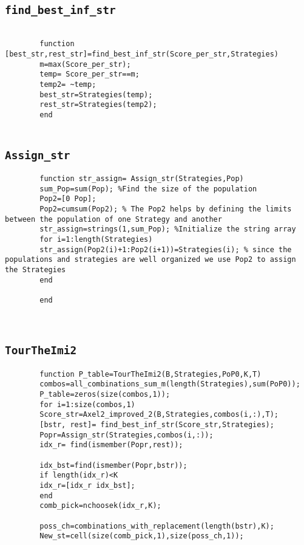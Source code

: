 \begin{appendices}
\begin{lstlisting}
	\end{lstlisting}
	
	\subsection*{\texttt{find\_best\_inf\_str}}
	\label{appendix:FBIS}
	\begin{lstlisting}
		
		function [best_str,rest_str]=find_best_inf_str(Score_per_str,Strategies)
		m=max(Score_per_str);
		temp= Score_per_str==m;
		temp2= ~temp;
		best_str=Strategies(temp);
		rest_str=Strategies(temp2);
		end
		
	\end{lstlisting}
	
	\subsection*{\texttt{Assign\_str}}
	\label{appendix:ASstr}
		\begin{lstlisting}
		function str_assign= Assign_str(Strategies,Pop)
		sum_Pop=sum(Pop); %Find the size of the population
		Pop2=[0 Pop];
		Pop2=cumsum(Pop2); % The Pop2 helps by defining the limits between the population of one Strategy and another
		str_assign=strings(1,sum_Pop); %Initialize the string array
		for i=1:length(Strategies)
		str_assign(Pop2(i)+1:Pop2(i+1))=Strategies(i); % since the populations and strategies are well organized we use Pop2 to assign the Strategies
		end
		
		end
		
		
	\end{lstlisting}
	\subsection*{\texttt{TourTheImi2}}
	\label{appendix:TTI2}
	\begin{lstlisting}
		function P_table=TourTheImi2(B,Strategies,PoP0,K,T)
		combos=all_combinations_sum_m(length(Strategies),sum(PoP0));
		P_table=zeros(size(combos,1));
		for i=1:size(combos,1)
		Score_str=Axel2_improved_2(B,Strategies,combos(i,:),T);
		[bstr, rest]= find_best_inf_str(Score_str,Strategies);
		Popr=Assign_str(Strategies,combos(i,:));
		idx_r= find(ismember(Popr,rest));
		
		idx_bst=find(ismember(Popr,bstr));
		if length(idx_r)<K
		idx_r=[idx_r idx_bst];
		end
		comb_pick=nchoosek(idx_r,K);
		
		poss_ch=combinations_with_replacement(length(bstr),K);
		New_st=cell(size(comb_pick,1),size(poss_ch,1));
		

\end{lstlisting}
\end{appendices}
